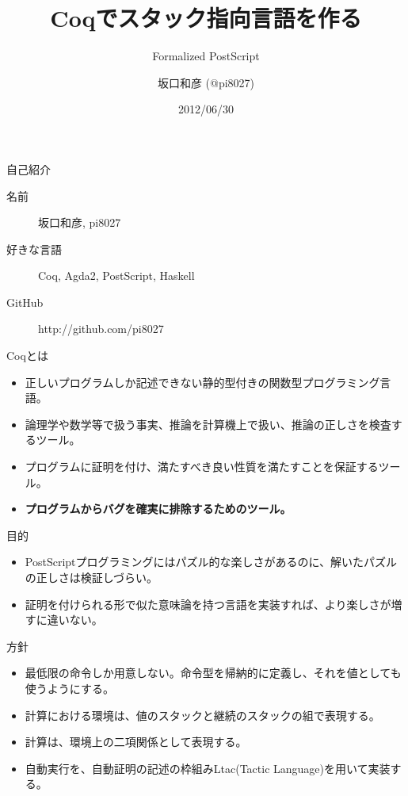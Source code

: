 \documentclass[cjk, 14pt]{beamer}
\title{Coqでスタック指向言語を作る}
\subtitle{Formalized PostScript}
\author{坂口和彦 (@pi8027)}
\institute{筑波大学 情報学群 情報科学類 B2}
\date{2012/06/30}
\begin{document}
\begin{frame}[plain]

 \maketitle

\end{frame}

\begin{frame}{自己紹介}

  \begin{description}
    \item [名前] 坂口和彦, pi8027
    \item [好きな言語] Coq, Agda2, PostScript, Haskell
    \item [GitHub] http://github.com/pi8027
  \end{description}

\end{frame}

\begin{frame}{Coqとは}

  \begin{itemize}
    \item 正しいプログラムしか記述できない静的型付きの関数型プログラミング言語。
    \item 論理学や数学等で扱う事実、推論を計算機上で扱い、推論の正しさを検査するツール。
    \item プログラムに証明を付け、満たすべき良い性質を満たすことを保証するツール。
    \item \textbf{プログラムからバグを確実に排除するためのツール。}
  \end{itemize}

\end{frame}

\begin{frame}{目的}

  \begin{itemize}
    \item PostScriptプログラミングにはパズル的な楽しさがあるのに、解いたパズルの正しさは検証しづらい。
    \item 証明を付けられる形で似た意味論を持つ言語を実装すれば、より楽しさが増すに違いない。
  \end{itemize}

\end{frame}

\begin{frame}{方針}

  \begin{itemize}
    \item 最低限の命令しか用意しない。命令型を帰納的に定義し、それを値としても使うようにする。
    \item 計算における環境は、値のスタックと継続のスタックの組で表現する。
    \item 計算は、環境上の二項関係として表現する。
    \item 自動実行を、自動証明の記述の枠組みLtac(Tactic Language)を用いて実装する。
  \end{itemize}

\end{frame}
\end{document}
